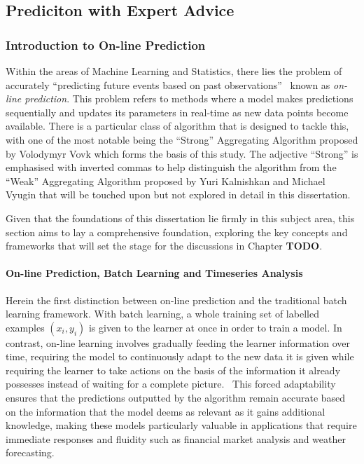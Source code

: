 \subsection{Prediciton with Expert Advice}
\subsubsection{Introduction to On-line Prediction}


\noindent Within the areas of Machine Learning and Statistics, there lies the problem of accurately ``predicting future events based on past observations''~\cite{cesa-bianchi:1997}  known as \textit{on-line prediction}. This problem refers to methods where a model makes predictions sequentially and updates its parameters in real-time as new data points become available. There is a particular class of algorithm that is designed to tackle this, with one of the most notable being the ``Strong'' Aggregating Algorithm proposed by Volodymyr Vovk \cite{vovk:1990} which forms the basis of this study. The adjective ``Strong'' is emphasised with inverted commas to help distinguish the algorithm from the ``Weak'' Aggregating Algorithm proposed by Yuri Kalnishkan and Michael Vyugin \cite{kalnishkan/vyugin:2008} that will be touched upon but not explored in detail in this dissertation.

Given that the foundations of this dissertation lie firmly in this subject area, this section aims to lay a comprehensive foundation, exploring the key concepts and frameworks that will set the stage for the discussions in Chapter \textbf{TODO}.

\paragraph*{On-line Prediction, Batch Learning and Timeseries Analysis}
Herein the first distinction between on-line prediction and the traditional batch learning framework. With batch learning, a whole training set of labelled examples $(x_i, y_i)$ is given to the learner at once in order to train a model. In contrast, on-line learning involves gradually feeding the learner information over time, requiring the model to continuously adapt to the new data it is given while requiring the learner to take actions on the basis of the information it already possesses instead of waiting for a complete picture.~\cite{kalnishkan:2015} This forced adaptability ensures that the predictions outputted by the algorithm remain accurate based on the information that the model deems as relevant as it gains additional knowledge, making these models particularly valuable in applications that require immediate responses and fluidity such as financial market analysis and weather forecasting.

